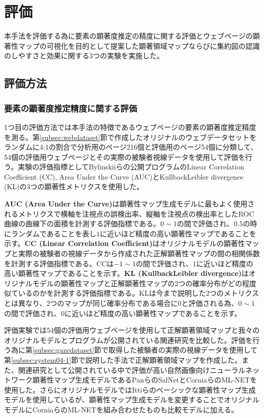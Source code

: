 \newpage
\renewcommand{\baselinestretch}{1.5}
\section{評価}
\renewcommand{\baselinestretch}{1}
\par 本手法を評価する為に要素の顕著度推定の精度に関する評価とウェブページの顕著性マップの可視化を目的として提案した顕著領域マップならびに集約図の認識のしやすさと効果に関する3つの実験を実施した。

\subsection{評価方法}
\subsubsection{要素の顕著度推定精度に関する評価}
\par 1つ目の評価方法では本手法の特徴であるウェブページの要素の顕著度推定精度を測る。第\ref{subsec:webdataset}節で作成したオリジナルのウェブデータセットをランダムに4:1の割合で分析用のページ216個と評価用のページ54個に分類して、54個の評価用ウェブページとその実際の被験者視線データを使用して評価を行う。実験の評価指標としてBylinskiiらの公開プログラム\cite{salMetrics_Bylinskii}のLinear Correlation Coefficient (CC), Area Under the Curve (AUC)とKullback\-Leibler divergence (KL)の3つの顕著性メトリクスを使用した。

\par {\bf AUC (Area Under the Curve)}は顕著性マップ生成モデルに最もよく使用されるメトリクスで横軸を注視点の誤検出率、縦軸を注視点の検出率としたROC曲線の曲線下の面積を計測する評価指標である。$0\sim1$の間で評価され、$0.5$の時にランダムであることを表し$1$に近いほど精度の高い顕著性マップであることを示す。{\bf CC (Linear Correlation Coefficient)}はオリジナルモデルの顕著性マップと実際の被験者の視線データから作成された正解顕著性マップの間の相関係数を計測する評価指標である。CCは$-1\sim1$の間で評価され、$1$に近いほど精度の高い顕著性マップであることを示す。{\bf KL (Kullback\-Leibler divergence)}はオリジナルモデルの顕著性マップと正解顕著性マップの2つの確率分布がどの程度似ているのかを計測する評価指標である。KLは今まで説明した2つのメトリクスとは異なり、2つのマップが同じ確率分布である場合に$0$と評価される為、$0\sim1$の間で評価され、$0$に近いほど精度の高い顕著性マップであることを示す。

\par 評価実験では54個の評価用ウェブページを使用して正解顕著領域マップと我々のオリジナルモデルとプログラムが公開されている関連研究を比較した。評価を行う為に第\ref{subsec:gazedataset}節で取得した被験者の実際の視線データを使用して第\ref{subsec:system04-1}節で説明した手法で正解顕著領域マップを作成した。また、関連研究として公開されている中で評価が高い自然画像向けニューラルネットワーク顕著性マップ生成モデルであるPanらのSalNet\cite{pan2016shallow}とCorniaらのML-NET\cite{mlnet2016}を使用した。さらにオリジナルモデルではIttiらのベーシックな顕著性マップ生成モデル\cite{itti1998model}を使用しているが、顕著性マップ生成モデルを変更することでオリジナルモデルにCorniaらのML-NET\cite{mlnet2016}を組み合わせたものも比較モデルに加える。


